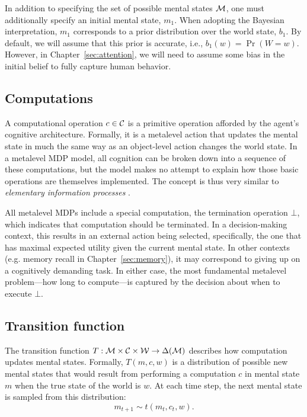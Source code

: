 In addition to specifying the set of possible mental states $\mathcal{M}$, one must additionally specify an initial mental state, $m_1$. When adopting the Bayesian interpretation, $m_1$ corresponds to a prior distribution over the world state, $b_1$. By default, we will assume that this prior is accurate, i.e., $b_1(w) = \Pr(W=w)$. However, in Chapter~\ref{sec:attention}, we will need to assume some bias in the initial belief to fully capture human behavior.



\subsection{Computations}
A computational operation $c \in \mathcal{C}$ is a primitive operation afforded by the agent's cognitive architecture. Formally, it is a metalevel action that updates the mental state in much the same way as an object-level action changes the world state. In a metalevel MDP model, all cognition can be broken down into a sequence of these computations, but the model makes no attempt to explain how those basic operations are themselves implemented. The concept is thus very similar to \emph{elementary information processes} \citep{chase1978elementary,simon1979information,posner1982information,payne1988adaptive}. 

All metalevel MDPs include a special computation, the termination operation $\bot$, which indicates that computation should be terminated. In a decision-making context, this results in an external action being selected, specifically, the one that has maximal expected utility given the current mental state. In other contexts (e.g. memory recall in Chapter~\ref{sec:memory}), it may correspond to giving up on a cognitively demanding task. In either case, the most fundamental metalevel problem---how long to compute---is captured by the decision about when to execute $\bot$.

\subsection{Transition function}
The transition function $T: \mathcal{M} \times \mathcal{C} \times \mathcal{W} \rightarrow \Delta(\mathcal{M})$ describes how computation updates mental states. Formally, $T(m, c, w)$ is a distribution of possible new mental states that would result from performing a computation $c$ in mental state $m$ when the true state of the world is $w$. At each time step, the next mental state is sampled from this distribution:
\begin{equation}\label{eq:transition}
m_{t+1} \sim t(m_t, c_t, w).
\end{equation}

